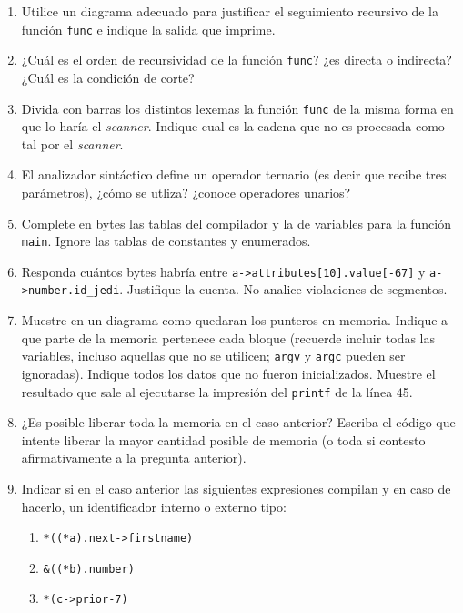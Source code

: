 \documentclass{article}
\begin{document}
\renewcommand\theenumi{\alph{enumi}}
\renewcommand\theenumii{\roman{enumii}}
\begin{enumerate}
 \setlength{\itemsep}{1pt}
 \item {Utilice un diagrama adecuado para justificar el seguimiento recursivo de la función \verb!func! e indique la salida que imprime.}
 \item {¿Cuál es el orden de recursividad de la función \verb!func!? ¿es directa o indirecta? ¿Cuál es la condición de corte?}
 \item {Divida con barras los distintos lexemas la función \verb!func! de la misma forma en que lo haría el {\it scanner}. Indique cual es la cadena que no es procesada como tal por el {\it scanner}.}
 \item {El analizador sintáctico define un operador ternario (es decir que recibe tres parámetros), ¿cómo se utliza? ¿conoce operadores unarios?}
 \item {Complete en bytes las tablas del compilador y la de variables para la función \verb!main!. Ignore las tablas de constantes y enumerados.}
 \item {Responda cuántos bytes habría entre \verb!a->attributes[10].value[-67]! y \verb!a->number.id_jedi!. Justifique la cuenta. No analice violaciones de segmentos.}
 \item {Muestre en un diagrama como quedaran los punteros en memoria. Indique a que parte de la memoria
pertenece cada bloque (recuerde incluir todas las variables, incluso aquellas que no se utilicen; \verb!argv! y
\verb!argc! pueden ser ignoradas). Indique todos los datos que no fueron inicializados. Muestre el resultado que sale al ejecutarse la impresión del \verb!printf! de la línea 45.}
 \item {¿Es posible liberar toda la memoria en el caso anterior? Escriba el código que intente liberar la mayor cantidad posible de memoria (o toda si contesto afirmativamente a la pregunta anterior).}
 \item {Indicar si en el caso anterior las siguientes expresiones compilan y en caso de hacerlo, un identificador interno o externo tipo:
  \begin{enumerate}
   \item {\verb!*((*a).next->firstname)!}
   \item {\verb!&((*b).number)!}
   \item {\verb!*(c->prior-7)!}
  \end{enumerate}
 }
\end{enumerate}
\end{document}
